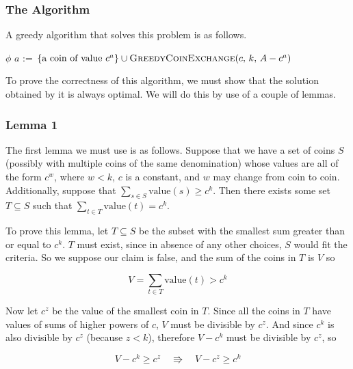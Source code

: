 \documentclass{article}
\begin{document}
\subsubsection*{The Algorithm}

A greedy algorithm that solves this problem is as follows.

\begin{algorithm}
	\begin{algorithmic}
		\Return \(\phi\)
		\EndIf
		\State \(a\) := 
		\State \Return \(\{\text{a coin of value } c^a\} \cup \text{\Call{GreedyCoinExchange}{$c$, $k$, $A - c^a$}}\)
		\EndFunction
	\end{algorithmic}
\end{algorithm}

To prove the correctness of this algorithm, we must show that the solution obtained by it is always optimal. We will do this by use of a couple of lemmas.

\subsubsection*{Lemma 1}

The first lemma we must use is as follows. Suppose that we have a set of coins \(S\) (possibly with multiple coins of the same denomination) whose values are all of the form \(c^w\), where \(w<k\), \(c\) is a constant, and \(w\) may change from coin to coin. Additionally, suppose that \(\sum_{s \in S}\text{value}(s) \geq c^k\). Then there exists some set \(T \subseteq S\) such that \(\sum_{t \in T}\text{value}(t) = c^k\).

To prove this lemma, let \(T \subseteq S\) be the subset with the smallest sum greater than or equal to \(c^k\). \(T\) must exist, since in absence of any other choices, \(S\) would fit the criteria. So we suppose our claim is false, and the sum of the coins in \(T\) is \(V\) so

\[V = \sum_{t \in T} \text{value} (t) > c^k\]

Now let \(c^z\) be the value of the smallest coin in \(T\). Since all the coins in \(T\) have values of sums of higher powers of \(c\), \(V\) must be divisible by \(c^z\). And since \(c^k\) is also divisible by \(c^z\) (because \(z < k\)), therefore \(V - c^k\) must be divisible by \(c^z\), so

\[V - c^k \geq c^z \quad \Rrightarrow \quad V - c^z \geq c^k\]
\end{document}
